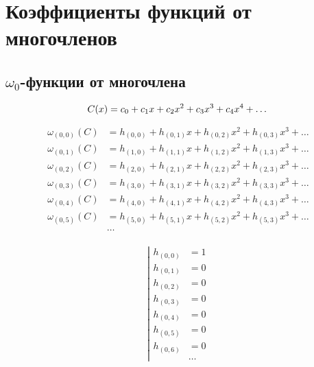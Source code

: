 
\section{Коэффициенты функций от многочленов}

\subsection{$\omega_0$-функции от многочлена}

\begin{equation*}
C(x) = c_0 + c_1 x + c_2 x^2 + c_3 x^3 + c_4 x^4 + \ldots \\
\end{equation*}

\begin{equation*} \begin{aligned}
\omega_{(0,0)}(C) &= h_{(0,0)} + h_{(0,1)} x + h_{(0,2)} x^2 + h_{(0,3)} x^3 + \ldots \\
\omega_{(0,1)}(C) &= h_{(1,0)} + h_{(1,1)} x + h_{(1,2)} x^2 + h_{(1,3)} x^3 + \ldots \\
\omega_{(0,2)}(C) &= h_{(2,0)} + h_{(2,1)} x + h_{(2,2)} x^2 + h_{(2,3)} x^3 + \ldots \\
\omega_{(0,3)}(C) &= h_{(3,0)} + h_{(3,1)} x + h_{(3,2)} x^2 + h_{(3,3)} x^3 + \ldots \\
\omega_{(0,4)}(C) &= h_{(4,0)} + h_{(4,1)} x + h_{(4,2)} x^2 + h_{(4,3)} x^3 + \ldots \\
\omega_{(0,5)}(C) &= h_{(5,0)} + h_{(5,1)} x + h_{(5,2)} x^2 + h_{(5,3)} x^3 + \ldots \\
&\ldots \\
\end{aligned} \end{equation*}

\begin{equation*} \left| \begin{aligned} 
h_{(0,0)} &= 1 \\ 
h_{(0,1)} &= 0 \\
h_{(0,2)} &= 0 \\
h_{(0,3)} &= 0 \\
h_{(0,4)} &= 0 \\
h_{(0,5)} &= 0 \\
h_{(0,6)} &= 0 \\
&\ldots
\end{aligned} \right. \end{equation*}

